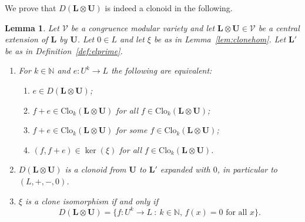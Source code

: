 \documentclass[10pt,a4paper]{amsart}
\numberwithin{equation}{section}
\newtheorem{lemma}[theorem]{Lemma}
\newcommand{\st}{\ :\ }
\renewcommand{\L}{\mathbf{L}}
\newcommand{\N}{\mathbb{N}}
\newcommand{\U}{\mathbf{U}}
\newcommand{\V}{\mathcal{V}}
\newcommand{\Clo}{\mathrm{Clo}}
\begin{document}
We prove that $D(\L\otimes\U)$ is indeed a clonoid in the following.
 
\begin{lemma} \label{lem:diff} 
  Let $\V$ be a congruence modular variety and let $\L \otimes \U \in \V$ be a central extension of $\L$ by $\U$. 
  Let $0 \in L$ and let $\xi$ be as in Lemma~\ref{lem:clonehom}.  
  Let  $\L'$ be as in Definition~\ref{def:elprime}.
  \begin{enumerate}
    \item  \label{it:addon}
      For $k\in\N$ and $e\colon U^k\to L$ the following are equivalent:
      \begin{enumerate} 
        \item $e\in D(\L\otimes\U)$;
        \item $f+e \in\Clo_k(\L\otimes\U)$ for all $f\in\Clo_k(\L\otimes\U)$;
        \item $f+e \in\Clo_k(\L\otimes\U)$ for some $f\in\Clo_k(\L\otimes\U)$;
        \item $(f, f+e) \in \ker(\xi)$ for all $f \in \Clo_k(\L \otimes \U)$.
      \end{enumerate}   
    \item \label{it:clonoid}
      $D(\L\otimes\U)$ is a clonoid from $\U$ to $\L'$ expanded with $0$, in particular to $(L,+,-,0)$.
    \item \label{it:zero} 
      $\xi$ is a clone isomorphism if and only if
        \[D(\L\otimes\U) = \{ f \colon U^k \rightarrow L \st k \in \N, \,  f(x) = 0 \text{ for all } x \}.\]
  \end{enumerate}
\end{lemma}
\end{document}
